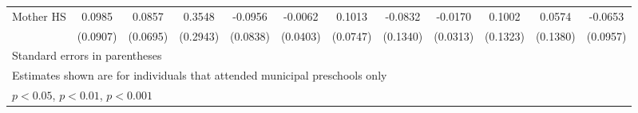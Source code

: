 \begin{table}[htbp]
\begin{tabular*}{0.7\hsize}{@{\hskip\tabcolsep\extracolsep\fill}l*{11}{c}}
\addlinespace
Mother HS   &      0.0985         &      0.0857         &      0.3548         &     -0.0956         &     -0.0062         &      0.1013         &     -0.0832         &     -0.0170         &      0.1002         &      0.0574         &     -0.0653         \\
            &    (0.0907)         &    (0.0695)         &    (0.2943)         &    (0.0838)         &    (0.0403)         &    (0.0747)         &    (0.1340)         &    (0.0313)         &    (0.1323)         &    (0.1380)         &    (0.0957)         \\
\bottomrule
\multicolumn{12}{l}{\footnotesize Standard errors in parentheses}\\
\multicolumn{12}{l}{\footnotesize Estimates shown are for individuals that attended municipal preschools only}\\
\multicolumn{12}{l}{\footnotesize \sym{*} \(p<0.05\), \sym{**} \(p<0.01\), \sym{***} \(p<0.001\)}\\
\end{tabular*}
\end{table}
